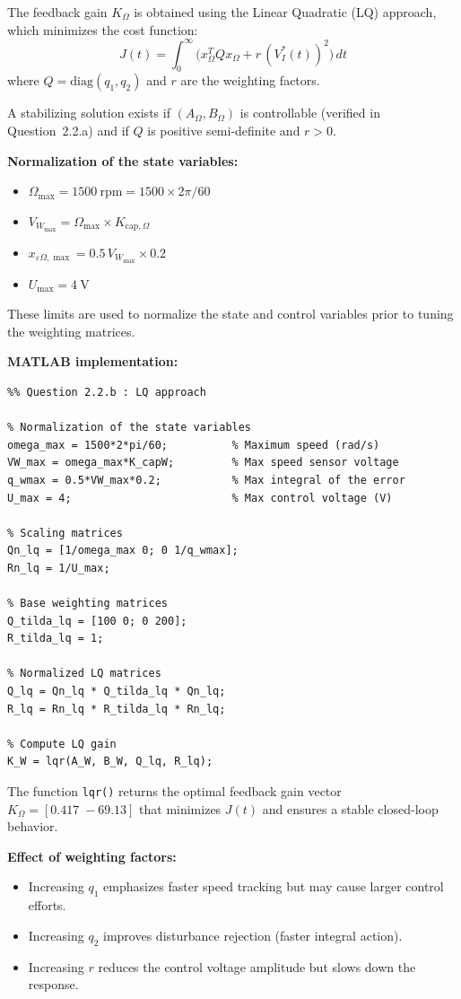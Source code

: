 \documentclass{rapportCS}
\begin{document}
The feedback gain $K_\Omega$ is obtained using the Linear Quadratic (LQ) approach, which minimizes the cost function:
\begin{equation*}
J(t) = \int_0^\infty \big(x_\Omega^T Q x_\Omega + r \,(V_I^*(t))^2\big)\,dt
\end{equation*}
where $Q = \mathrm{diag}(q_1, q_2)$ and $r$ are the weighting factors.

A stabilizing solution exists if $(A_\Omega,B_\Omega)$ is controllable (verified in Question~2.2.a) and if
$Q$ is positive semi-definite and $r>0$.

\noindent\textbf{Normalization of the state variables:}
\begin{itemize}
    \item $\Omega_{\max} = 1500~\mathrm{rpm} = 1500 \times 2\pi / 60$
    \item $V_{W_{\max}} = \Omega_{\max} \times K_{\mathrm{cap},\Omega}$
    \item $x_{\varepsilon\Omega,\max} = 0.5\,V_{W_{\max}} \times 0.2$
    \item $U_{\max} = 4~\mathrm{V}$
\end{itemize}

These limits are used to normalize the state and control variables prior to tuning the weighting matrices.

\noindent\textbf{MATLAB implementation:}
\begin{verbatim}
%% Question 2.2.b : LQ approach

% Normalization of the state variables
omega_max = 1500*2*pi/60;          % Maximum speed (rad/s)
VW_max = omega_max*K_capW;         % Max speed sensor voltage
q_wmax = 0.5*VW_max*0.2;           % Max integral of the error
U_max = 4;                         % Max control voltage (V)

% Scaling matrices
Qn_lq = [1/omega_max 0; 0 1/q_wmax]; 
Rn_lq = 1/U_max;

% Base weighting matrices
Q_tilda_lq = [100 0; 0 200];
R_tilda_lq = 1;

% Normalized LQ matrices
Q_lq = Qn_lq * Q_tilda_lq * Qn_lq;
R_lq = Rn_lq * R_tilda_lq * Rn_lq;

% Compute LQ gain
K_W = lqr(A_W, B_W, Q_lq, R_lq);
\end{verbatim}

\noindent The function \texttt{lqr()} returns the optimal feedback gain vector
$K_\Omega = [0.417\; -69.13]$ that minimizes $J(t)$ and ensures
a stable closed-loop behavior.

\noindent\textbf{Effect of weighting factors:}
\begin{itemize}
    \item Increasing $q_1$ emphasizes faster speed tracking but may cause larger control efforts.
    \item Increasing $q_2$ improves disturbance rejection (faster integral action).
    \item Increasing $r$ reduces the control voltage amplitude but slows down the response.
\end{itemize}
\end{document}
